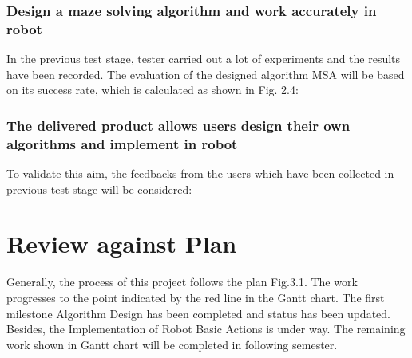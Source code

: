 \documentclass[11pt,times,oneside,openright,hardcopy]{eeereport}
\begin{document}
\subsection{Design a maze solving algorithm and work accurately in robot}
In the previous test stage, tester carried out a lot of experiments and the results have been recorded. 
The evaluation of the designed algorithm MSA will be based on its success rate, which is calculated as shown in Fig. 2.4:

\subsection{The delivered product allows users design their own algorithms and implement in robot}
To validate this aim, the feedbacks from the users which have been collected in previous test stage will be considered:

\chapter{Review against Plan}
Generally, the process of this project follows the plan Fig.3.1. The work progresses to the point indicated by the red line in the Gantt chart. The first milestone Algorithm Design has been completed and status has been updated. 
Besides, the Implementation of Robot Basic Actions is under way. The remaining work shown in Gantt chart will be completed in following semester.





\end{document}
